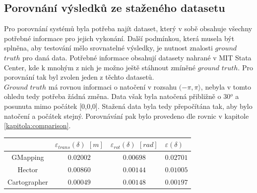 \documentclass[12pt]{report}
\begin{document}
\subsection{Porovnání výsledků ze staženého datasetu}
Pro porovnání systémů byla potřeba najít dataset, který v sobě obsahuje všechny potřebné informace pro jejich vykonání. Další podmínkou, která musela být splněna, aby testování mělo srovnatelné výsledky, je nutnost znalosti $ground$ $truth$ pro daná data. Potřebné informace obsahují datasety nahrané v MIT Stata Center, kde k mnohým z nich je možno ještě stáhnout zmíněné $ground$ $truth$. Pro porovnání tak byl zvolen jeden z těchto datasetů.\\
\indent $Ground$ $truth$ má rovnou informaci o natočení v rozsahu $(-\pi,\pi\rangle$, nebyla v tomto  ohledu tedy potřeba žádná změna. Data však byla natočená přibližně o 30$^o$ a posunuta mimo počátek [0,0,0]. Stažená data byla tedy přepočítána tak, aby bylo natočení a počátek stejný. Porovnávání pak bylo provedeno dle rovnic v kapitole \ref{kapitola:comparison}.\\
\begin{center}
	\begin{tabular}{c|ccp{3cm}}
		\bfseries \bfseries  & $\varepsilon_{trans}(\delta)$ $[m]$ & $\varepsilon_{rot}(\delta)$ $[rad]$ & $\varepsilon(\delta)$  \\ [2mm]
		\hline
		GMapping & $0.02002$ & $0.00698$ & $0.02701$  \\ 
		Hector & $0.00860$ & $0.00144$ & $0.01005$  \\ 
		Cartographer & $0.00049$ & $0.00148$ & $0.00197$  \\
	\end{tabular}
\end{center}
\end{document}
